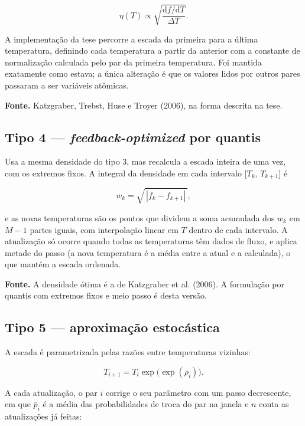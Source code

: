 \documentclass[10pt,a4paper]{article}
\begin{document}
\[
\eta(T) \propto \sqrt{\frac{\mathrm{d}f/\mathrm{d}T}{\Delta T}}.
\]

A implementação da tese percorre a escada da primeira para a última temperatura, definindo cada temperatura a partir da anterior com a constante de normalização calculada pelo par da primeira temperatura. Foi mantida exatamente como estava; a única alteração é que os valores lidos por outros pares passaram a ser variáveis atômicas.

\begin{fonte}
\textbf{Fonte.} Katzgraber, Trebst, Huse e Troyer (2006), na forma descrita na tese.
\end{fonte}

\subsection*{Tipo 4 — \textit{feedback-optimized} por quantis}

Usa a mesma densidade do tipo 3, mas recalcula a escada inteira de uma vez, com os extremos fixos. A integral da densidade em cada intervalo [$T_{k}$, $T_{k+1}$] é

\[
w_k = \sqrt{\,|f_k - f_{k+1}|\,},
\]

e as novas temperaturas são os pontos que dividem a soma acumulada dos $w_{k}$ em $M-1$ partes iguais, com interpolação linear em $T$ dentro de cada intervalo. A atualização só ocorre quando todas as temperaturas têm dados de fluxo, e aplica metade do passo (a nova temperatura é a média entre a atual e a calculada), o que mantém a escada ordenada.

\begin{fonte}
\textbf{Fonte.} A densidade ótima é a de Katzgraber et al. (2006). A formulação por quantis com extremos fixos e meio passo é desta versão.
\end{fonte}

\subsection*{Tipo 5 — aproximação estocástica}

A escada é parametrizada pelas razões entre temperaturas vizinhas:

\[
T_{i+1} = T_i \exp\bigl(\exp(\rho_i)\bigr).
\]

A cada atualização, o par $i$ corrige o seu parâmetro com um passo decrescente, em que $\bar{p}_{i}$ é a média das probabilidades de troca do par na janela e $n$ conta as atualizações já feitas:
\end{document}
